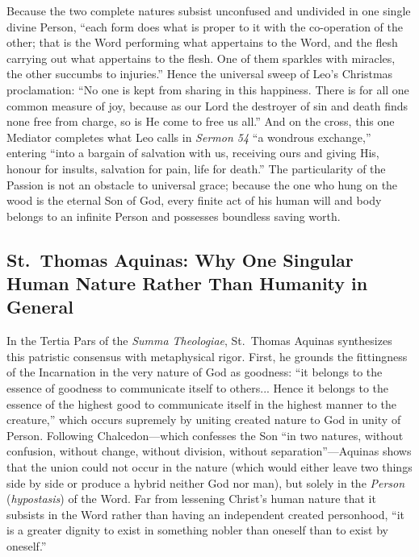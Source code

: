 Because the two complete natures subsist unconfused and undivided in one single divine Person, ``each form does what is proper to it with the co-operation of the other; that is the Word performing what appertains to the Word, and the flesh carrying out what appertains to the flesh. One of them sparkles with miracles, the other succumbs to injuries.'' Hence the universal sweep of Leo's Christmas proclamation: ``No one is kept from sharing in this happiness. There is for all one common measure of joy, because as our Lord the destroyer of sin and death finds none free from charge, so is He come to free us all.'' And on the cross, this one Mediator completes what Leo calls in \textit{Sermon 54} ``a wondrous exchange,'' entering ``into a bargain of salvation with us, receiving ours and giving His, honour for insults, salvation for pain, life for death.'' The particularity of the Passion is not an obstacle to universal grace; because the one who hung on the wood is the eternal Son of God, every finite act of his human will and body belongs to an infinite Person and possesses boundless saving worth.

\subsection{St.\ Thomas Aquinas: Why One Singular Human Nature Rather Than Humanity in General}

In the Tertia Pars of the \textit{Summa Theologiae}, St.\ Thomas Aquinas synthesizes this patristic consensus with metaphysical rigor. First, he grounds the fittingness of the Incarnation in the very nature of God as goodness: ``it belongs to the essence of goodness to communicate itself to others... Hence it belongs to the essence of the highest good to communicate itself in the highest manner to the creature,'' which occurs supremely by uniting created nature to God in unity of Person. Following Chalcedon---which confesses the Son ``in two natures, without confusion, without change, without division, without separation''---Aquinas shows that the union could not occur in the nature (which would either leave two things side by side or produce a hybrid neither God nor man), but solely in the \textit{Person} (\textit{hypostasis}) of the Word. Far from lessening Christ's human nature that it subsists in the Word rather than having an independent created personhood, ``it is a greater dignity to exist in something nobler than oneself than to exist by oneself.''

